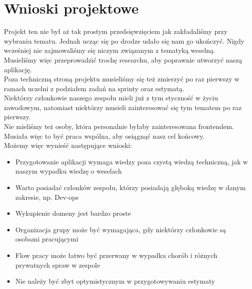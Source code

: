 \documentclass{article}
\begin{document}
\section{Wnioski projektowe}
Projekt ten nie był aż tak prostym przedsięwzięciem jak zakładaliśmy przy wybraniu tematu. Jednak ucząc się po drodze udało się nam go ukończyć. Nigdy wcześniej nie zajmowaliśmy się niczym związanym z tematyką weselną. Musieliśmy więc przeprowadzić trochę researchu, aby poprawnie utworzyć naszą aplikację.\\
Poza techniczną stroną projektu musieliśmy się też zmierzyć po raz pierwszy w ramach uczelni z podziałem zadań na sprinty oraz estymatą.\\
Niektórzy członkowie naszego zespołu mieli już z tym styczność w życiu zawodowym, natomiast niektórzy musieli zainteresować się tym tematem po raz pierwszy.\\
Nie mieliśmy też osoby, która personalnie byłaby zainteresowana frontendem. Musiała więc to być praca wspólna, aby osiągnąć nasz cel końcowy.\\
Możemy więc wynieść następujące wnioski:\\
\begin{itemize}
\item Przygotowanie aplikacji wymaga wiedzy poza czystą wiedzą techniczną, jak w naszym wypadku wiedzę o weselach
\item Warto posiadać członków zespołu, którzy posiadają głęboką wiedzę w danym zakresie, np. Dev-ops
\item Wykupienie domeny jest bardzo proste
\item Organizacja grupy może być wymagająca, gdy niektórzy członkowie są osobami pracującymi
\item Flow pracy może łatwo być przerwany w wypadku chorób i różnych prywatnych spraw w zespole
\item Nie należy być zbyt optymistycznym w przygotowywaniu estymaty
\end{itemize}
\end{document}
